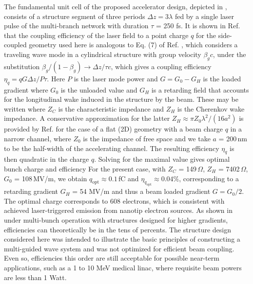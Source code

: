 The fundamental unit cell of the proposed accelerator design, depicted in , consists of a structure segment of three periods $\Delta z = 3 \lambda$ fed by a single laser pulse of the multi-branch network with duration $\tau$ = 250 fs.
It is shown in Ref.
 that the coupling efficiency of the laser field to a point charge $q$ for the side-coupled geometry used here is analogous to Eq.
(7) of Ref.
, which considers a traveling wave mode in a cylindrical structure with group velocity $\beta_g c$, under the substitution $\beta_g / (1-\beta_g) \rightarrow \Delta z / \tau c$, which gives a coupling efficiency $\eta_q = q G \Delta z / P \tau$.
 Here $P$ is the laser mode power and $G = G_0 - G_H$ is the loaded gradient where $G_0$ is the unloaded value and $G_H$ is a retarding field that accounts for the longitudinal wake induced in the structure by the beam.
 These may be written
where $Z_C$ is the characteristic impedance and $Z_H$ is the Cherenkov wake impedance.
 A conservative approximation for the latter $Z_H \approx \pi Z_0 \lambda^2 / (16 a^2)$ is provided by Ref.
 for the case of a flat (2D) geometry with a beam charge $q$ in a narrow channel, where $Z_0$ is the impedance of free space and we take $a$ = 200\,nm to be the half-width of the accelerating channel.
 The resulting efficiency $\eta_q$ is then quadratic in the charge $q$.
 Solving for the maximal value gives optimal bunch charge and efficiency
For the present case, with $Z_C$ = 149\,$\Omega$, $Z_H$ = 7402\,$\Omega$, $G_0$ = 108\,MV/m, we obtain $q_\text{opt} \approx 0.1$\,fC and $\eta_{q_\text{opt}} \approx 0.04 \%$, corresponding to a retarding gradient  $G_H$ = 54 MV/m and thus a beam loaded gradient $G = G_0/2$.
 The optimal charge corresponds to 608 electrons, which is consistent with achieved laser-triggered emission from nanotip electron sources.
 As shown in \cite{Siemann:PRSTB05} under multi-bunch operation with structures designed for higher gradients, efficiencies can theoretically be in the tens of percents.
 The structure design considered here was intended to illustrate the basic principles of constructing a multi-guided wave system and was not optimized for efficient beam coupling.
 Even so, efficiencies this order are still acceptable for possible near-term applications, such as a 1 to 10 MeV medical linac, where requisite beam powers are less than 1 Watt.
 
